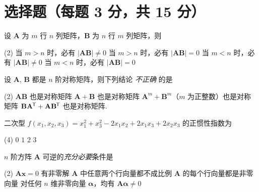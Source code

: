 \documentclass[fontset = fandol]{ctexart}
\newcommand*\mat[1]{\mathbf{#1}}
\newcommand*\trans[1]{#1^{\mkern-1.5mu\mathsf{T}}}
\begin{document}
\section{选择题（每题 3 分，共 15 分）}

\begin{problem}
  设 $\mat A$ 为 $m$ 行 $n$ 列矩阵，$\mat B$ 为 $n$ 行 $m$ 列矩阵，则
  \begin{tasks}(2)
    \task 当 $m > n$ 时，必有 $|\mat{AB}| \neq 0$
    \task 当 $m > n$ 时，必有 $|\mat{AB}| = 0$
    \task 当 $m < n$ 时，必有 $|\mat{AB}| \neq 0$
    \task 当 $m < n$ 时，必有 $|\mat{AB}| = 0$
  \end{tasks}
\end{problem}
\begin{solution}
  
\end{solution}

\begin{problem}
  设 $\mat A$, $\mat B$ 都是 $n$ 阶对称矩阵，则下列结论 \emph{不正确} 的是
  \begin{tasks}(2)
    \task $\mat{AB}$ 也是对称矩阵
    \task $\mat A + \mat B$ 也是对称矩阵
    \task $\mat A^m + \mat B^m$（$m$ 为正整数）也是对称矩阵
    \task $\mat B \trans{\mat A} + \mat A \trans{\mat B}$ 也是对称矩阵.
  \end{tasks}
\end{problem}
\begin{solution}
  
\end{solution}

\begin{problem}
  二次型 $f(x_1,x_2,x_3) = x_1^2 + x_3^2 - 2x_1x_2 + 2x_1x_3 + 2x_2x_3$
  的正惯性指数为
  \begin{tasks}(4)
    \task $0$
    \task $1$
    \task $2$
    \task $3$
  \end{tasks}
\end{problem}
\begin{solution}
  
\end{solution}

\begin{problem}
  $n$ 阶方阵 $\mat A$ 可逆的\emph{充分必要}条件是
  \begin{tasks}(2)
    \task $\mat A\bm x = 0$ 有非零解
    \task $\mat A$ 中任意两个行向量都不成比例
    \task $\mat A$ 的每个行向量都是非零向量
    \task 对任何 $n$ 维非零向量 $\bm\alpha$，均有 $\mat A\bm\alpha \neq 0$
  \end{tasks}
\end{problem}
\begin{solution}
  
\end{solution}
\end{document}
